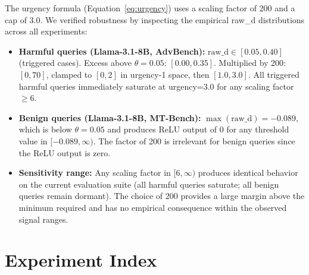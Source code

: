 \documentclass{article}
\begin{document}
The urgency formula (Equation~\ref{eq:urgency}) uses a scaling factor of 200 and a cap of 3.0.
We verified robustness by inspecting the empirical raw\_d distributions across all experiments:

\begin{itemize}
    \item \textbf{Harmful queries (Llama-3.1-8B, AdvBench):}
    $\text{raw\_d} \in [0.05, 0.40]$ (triggered cases). Excess above $\theta=0.05$: $[0.00, 0.35]$.
    Multiplied by 200: $[0, 70]$, clamped to $[0, 2]$ in urgency-1 space, then $[1.0, 3.0]$.
    All triggered harmful queries immediately saturate at urgency=3.0 for any scaling factor $\ge 6$.

    \item \textbf{Benign queries (Llama-3.1-8B, MT-Bench):}
    $\max(\text{raw\_d}) = {-0.089}$, which is below $\theta=0.05$ and produces ReLU output of 0
    for any threshold value in $[-0.089, \infty)$.
    The factor of 200 is irrelevant for benign queries since the ReLU output is zero.

    \item \textbf{Sensitivity range:}
    Any scaling factor in $[6, \infty)$ produces identical behavior on the current
    evaluation suite (all harmful queries saturate; all benign queries remain dormant).
    The choice of 200 provides a large margin above the minimum required and has
    no empirical consequence within the observed signal ranges.
\end{itemize}

\section{Experiment Index}
\label{app:xp}
\end{document}

